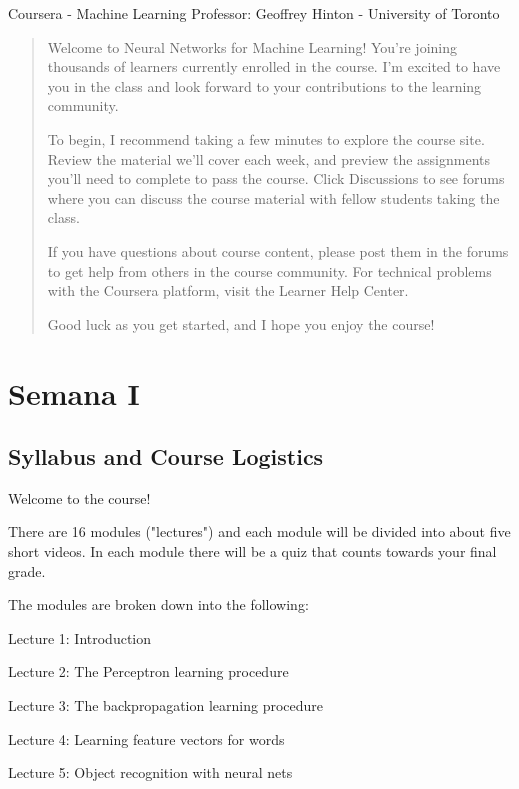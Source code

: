 \textsf{Coursera} - Machine Learning
Professor: Geoffrey Hinton - University of Toronto

\def\r          {`\textsf{R}'}%
\def\octave     {\textsf{GNU Oc\-ta\-ve}}%


\begin{abstract}
Welcome to Neural Networks for Machine Learning! You’re joining thousands of learners currently enrolled in the course. I'm excited to have you in the class and look forward to your contributions to the learning community.

To begin, I recommend taking a few minutes to explore the course site. Review the material we’ll cover each week, and preview the assignments you’ll need to complete to pass the course. Click Discussions to see forums where you can discuss the course material with fellow students taking the class.

If you have questions about course content, please post them in the forums to get help from others in the course community. For technical problems with the Coursera platform, visit the Learner Help Center.

Good luck as you get started, and I hope you enjoy the course!
\end{abstract}


\section{Semana I}


\subsection{Syllabus and Course Logistics}

Welcome to the course!

There are 16 modules ("lectures") and each module will be divided into about five short videos. In each module there will be a quiz that counts towards your final grade.

The modules are broken down into the following:

Lecture 1: Introduction

Lecture 2: The Perceptron learning procedure

Lecture 3: The backpropagation learning procedure

Lecture 4: Learning feature vectors for words

Lecture 5: Object recognition with neural nets

